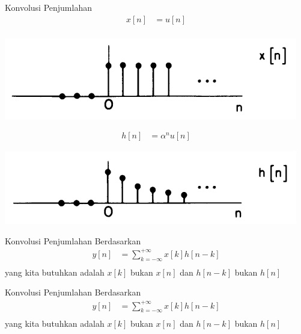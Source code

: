 \documentclass[pdflatex,compress,mathserif]{beamer}
\begin{document}
\begin{frame}{Konvolusi Penjumlahan}
	\begin{align*}
	x[n] &= u[n] \\
	\end{align*}
	\begin{center}
		\includegraphics[width=0.5\linewidth]{img/img09}
	\end{center}
	\begin{align*}
		h[n] &= \alpha^n u[n]
	\end{align*}
	\begin{center}
		\includegraphics[width=0.5\linewidth]{img/img10}
	\end{center}
\end{frame}

\begin{frame}{Konvolusi Penjumlahan}
	Berdasarkan
	\begin{align*}
		y[n] &= \sum_{k=-\infty}^{+\infty} x[k] h[n-k] \\
	\end{align*}
	yang kita butuhkan adalah $ x[k] $ bukan $ x[n] $ dan $ h[n-k] $ bukan $ h[n] $
\end{frame}

\begin{frame}{Konvolusi Penjumlahan}
	Berdasarkan
	\begin{align*}
	y[n] &= \sum_{k=-\infty}^{+\infty} x[k] h[n-k] \\
	\end{align*}
	yang kita butuhkan adalah $ x[k] $ bukan $ x[n] $ dan $ h[n-k] $ bukan $ h[n] $
\end{frame}
\end{document}
